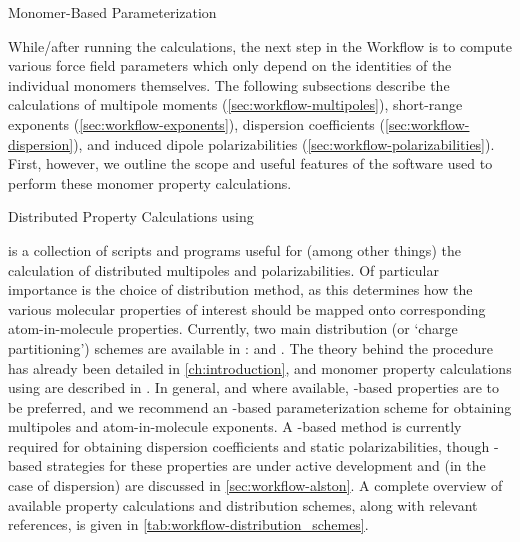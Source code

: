 \begin{section}{Monomer-Based Parameterization}
\label{sec:workflow-monomer_parameters}

While/after running the \dftsapt calculations, the next step in the Workflow
is to compute various force field parameters which only depend on the
identities of the individual monomers themselves. The following subsections describe the
calculations of multipole moments (\cref{sec:workflow-multipoles}),
short-range exponents (\cref{sec:workflow-exponents}), dispersion coefficients
(\cref{sec:workflow-dispersion}), and induced dipole polarizabilities
(\cref{sec:workflow-polarizabilities}). First, however, we 
outline the scope and useful features of the \camcasp software used to
perform these monomer property calculations.

\begin{subsection}{Distributed Property Calculations using \camcasp}

\camcasp is a collection of scripts and programs useful for (among other
things) the calculation of distributed multipoles and
polarizabilities.\cite{camcasp5.8} Of particular importance is the
choice of distribution method, as this determines how the various molecular properties
of interest should be mapped onto corresponding atom-in-molecule properties. Currently, two
main distribution (or `charge partitioning') schemes are available in \camcasp:
\dma\cite{Stone2005} and
\isa.\cite{Misquitta2014} The theory behind the \isa procedure has already been detailed in
\cref{ch:introduction}, and monomer property calculations using \dma are
described in 
. In general, and where
available, \isa-based properties are to be preferred, and we recommend an
\isa-based parameterization scheme for obtaining multipoles and
atom-in-molecule exponents. A \dma-based method is currently required for
obtaining dispersion coefficients and static polarizabilities, though
\isa-based strategies for these properties are under active development and
(in the case of dispersion) are discussed in \cref{sec:workflow-alston}.
A complete overview of
available property calculations and distribution schemes, along with relevant references,
is given in \cref{tab:workflow-distribution_schemes}.



\end{subsection}
\end{section}
